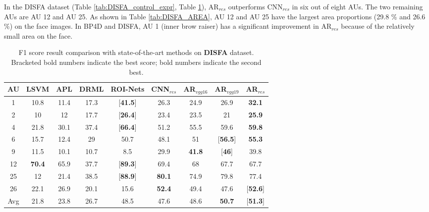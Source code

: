 \documentclass[5p,twocolumn]{elsarticle}
\begin{document}
In the DISFA dataset (Table \ref{tab:DISFA_control_expr}, Table \ref{tab:DISFA_F1}), AR$_{res}$ outperforms CNN$_{res}$ in six out of eight AUs. The two remaining AUs are AU 12 and AU 25. As shown in Table \ref{tab:DISFA_AREA}, AU 12 and AU 25 have the largest area proportions (29.8 \% and 26.6 \%) on the face images. In BP4D and DISFA, AU 1 (inner brow raiser) has a significant improvement in AR$_{res}$ because of the relatively small area on the face.
 \begin{table}
	\scriptsize
	\centering
	
	\setlength{\abovecaptionskip}{0pt} 
	
	\caption{F1 score result comparison with state-of-the-art methods on \textbf{DISFA} dataset. Bracketed bold numbers indicate the best score; bold numbers indicate the second best.}
	\label{tab:DISFA_F1}
	
	\centering
	\tabcolsep=0.05cm
	\begin{tabular}{c*{6}{c}cc}
		
		\toprule
		AU & LSVM & APL \cite{zhong2015learning} & DRML \cite{Zhao2016b} & ROI-Nets \cite{li2017action} & CNN$_{res}$ & AR$_{vgg16}$ & AR$_{vgg19}$ & AR$_{res}$ \\
		\midrule
	1 & 10.8 & 11.4 & 17.3 & [\textbf{41.5}] & 26.3 & 24.9 & 26.9 & \textbf{32.1} \\
	2 & 10 & 12 & 17.7 & [\textbf{26.4}] & 23.4 & 23.5 & 21 & \textbf{25.9} \\4 & 21.8 & 30.1 & 37.4 & [\textbf{66.4}] & 51.2 & 55.5 & 59.6 & \textbf{59.8} \\
	6 & 15.7 & 12.4 & 29 & 50.7 & 48.1 & 51 & [\textbf{56.5}] & \textbf{55.3} \\9 & 11.5 & 10.1 & 10.7 & 8.5 & 29.9 & \textbf{41.8} & [\textbf{46}] & 39.8 \\
	12 & \textbf{70.4} & 65.9 & 37.7 & [\textbf{89.3}] & 69.4 & 68 & 67.7 & 67.7 \\
	25 & 12 & 21.4 & 38.5 & [\textbf{88.9}] & \textbf{80.1} & 74.9 & 79.8 & 77.4 \\26 & 22.1 & 26.9 & 20.1 & 15.6 & \textbf{52.4} & 49.4 & 47.6 & [\textbf{52.6}] \\
	\midrule
	Avg & 21.8 & 23.8 & 26.7 & 48.5 & 47.6 & 48.6 & \textbf{50.7} & [\textbf{51.3}] \\
		\bottomrule
	\end{tabular}
	\vspace{-0.0cm}
\end{table}
\end{document}
